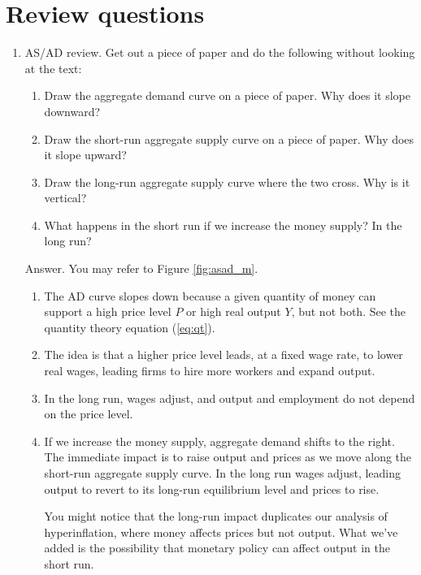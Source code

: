 \section*{Review questions}

\setlength{\leftmargini}{.5\oldleftmargini}
\begin{enumerate}
\item AS/AD review.  Get out a piece of paper and do the following
without looking at the text:
\begin{enumerate}
\item Draw the aggregate demand
 curve on a piece of paper.
Why does it slope downward?
\item Draw the short-run aggregate supply
 curve on a piece of paper.
Why does it slope upward?
\item Draw the long-run aggregate supply
 curve where the two cross.
Why is it vertical?
\item What happens in the short run if we increase the money supply?
In the long run?
\end{enumerate}

Answer. You may refer to Figure \ref{fig:asad_m}.
\begin{enumerate}
\item The AD curve slopes down because a given quantity of money
can support
a high price level $P$ or high real output $Y$, but not both.
See the quantity theory equation (\ref{eq:qt}).
\item The idea is that a higher price level leads, at a fixed wage rate,
to lower real wages, leading firms to hire more workers and expand output.
\item In the long run, wages adjust, and output and employment do not depend
on the price level.
\item If we increase the money supply, aggregate demand
 shifts to the right.
The immediate impact is to raise output and prices as we move along
the short-run aggregate supply
 curve.
In the long run wages adjust, leading output to revert to its long-run equilibrium
level and prices to rise.

You might notice that the long-run impact duplicates our analysis of hyperinflation,
where money affects prices but not output.
What we've added is the possibility that monetary policy can affect
output in the short run.
\end{enumerate}


\end{enumerate}
